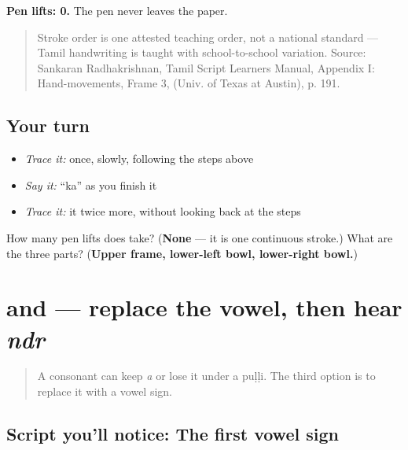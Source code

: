 \textbf{Pen lifts: 0.} The pen never leaves the paper.

\begin{quote}
Stroke order is one attested teaching order, not a national standard — Tamil handwriting is taught with school-to-school variation. Source: Sankaran Radhakrishnan, Tamil Script Learners Manual, Appendix I: Hand-movements, Frame 3,  (Univ. of Texas at Austin), p. 191.
\end{quote}

\subsection*{Your turn}
\begin{itemize}
\raggedright
  \item \emph{Trace it:}  once, slowly, following the steps above
  \item \emph{Say it:} \textquotedblleft{}ka\textquotedblright{} as you finish it
  \item \emph{Trace it:} it twice more, without looking back at the steps
\end{itemize}

\begin{tcolorbox}[breakable,colback=teal!4,colframe=teal!35!black,title={Before you move on}]
How many pen lifts does  take? (\textbf{None} — it is one continuous stroke.) What are the three parts? (\textbf{Upper frame, lower-left bowl, lower-right bowl.})
\end{tcolorbox}
\section[\texorpdfstring{\ta{ி}, \ta{நன்றி} (i, naṉṟi / nandri)}{ி, நன்றி (i, naṉṟi / nandri)}]{ and  — replace the vowel, then hear \emph{ndr}}

\label{lesson:TA-W04-i-sign-write-nandri}



\begin{quote}
A consonant can keep \emph{a} or lose it under a puḷḷi. The third option is to replace it with a vowel sign.
\end{quote}

\subsection*{Script you'll notice: The first vowel sign}


